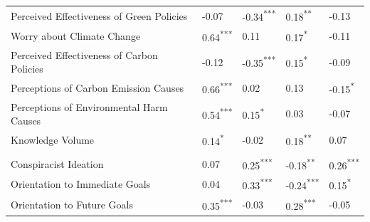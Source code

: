 \documentclass[
  letterpaper,
  DIV=11,
  numbers=noendperiod]{scrartcl}
\begin{document}
\begin{longtable}[t]{l>{\raggedright\arraybackslash}p{4.5em}>{\raggedright\arraybackslash}p{4.5em}>{\raggedright\arraybackslash}p{4.5em}>{\raggedright\arraybackslash}p{4.5em}}
\hspace{1em}Perceived Effectiveness of Green Policies & \textcolor[HTML]{808080}{-0.07} & \textcolor[HTML]{798234}{-0.34\textsuperscript{***}} & \textcolor[HTML]{D46780}{0.18\textsuperscript{**}} & \textcolor[HTML]{808080}{-0.13}\\
\hspace{1em}Worry about Climate Change & \textcolor[HTML]{D46780}{0.64\textsuperscript{***}} & \textcolor[HTML]{808080}{0.11} & \textcolor[HTML]{D46780}{0.17\textsuperscript{*}} & \textcolor[HTML]{808080}{-0.11}\\
\hspace{1em}Perceived Effectiveness of Carbon Policies & \textcolor[HTML]{808080}{-0.12} & \textcolor[HTML]{798234}{-0.35\textsuperscript{***}} & \textcolor[HTML]{D46780}{0.15\textsuperscript{*}} & \textcolor[HTML]{808080}{-0.09}\\
\hspace{1em}Perceptions of Carbon Emission Causes & \textcolor[HTML]{D46780}{0.66\textsuperscript{***}} & \textcolor[HTML]{808080}{0.02} & \textcolor[HTML]{808080}{0.13} & \textcolor[HTML]{798234}{-0.15\textsuperscript{*}}\\
\hspace{1em}Perceptions of Environmental Harm Causes & \textcolor[HTML]{D46780}{0.54\textsuperscript{***}} & \textcolor[HTML]{D46780}{0.15\textsuperscript{*}} & \textcolor[HTML]{808080}{0.03} & \textcolor[HTML]{808080}{-0.07}\\
\hspace{1em}Knowledge Volume & \textcolor[HTML]{D46780}{0.14\textsuperscript{*}} & \textcolor[HTML]{808080}{-0.02} & \textcolor[HTML]{D46780}{0.18\textsuperscript{**}} & \textcolor[HTML]{808080}{0.07}\\
\addlinespace[0.3em]
\multicolumn{5}{l}{\textbf{Cognitive style}}\\
\hspace{1em}Conspiracist Ideation & \textcolor[HTML]{808080}{0.07} & \textcolor[HTML]{D46780}{0.25\textsuperscript{***}} & \textcolor[HTML]{798234}{-0.18\textsuperscript{**}} & \textcolor[HTML]{D46780}{0.26\textsuperscript{***}}\\
\hspace{1em}Orientation to Immediate Goals & \textcolor[HTML]{808080}{0.04} & \textcolor[HTML]{D46780}{0.33\textsuperscript{***}} & \textcolor[HTML]{798234}{-0.24\textsuperscript{***}} & \textcolor[HTML]{D46780}{0.15\textsuperscript{*}}\\
\hspace{1em}Orientation to Future Goals & \textcolor[HTML]{D46780}{0.35\textsuperscript{***}} & \textcolor[HTML]{808080}{-0.03} & \textcolor[HTML]{D46780}{0.28\textsuperscript{***}} & \textcolor[HTML]{808080}{-0.05}\\

\end{longtable}
\end{document}
